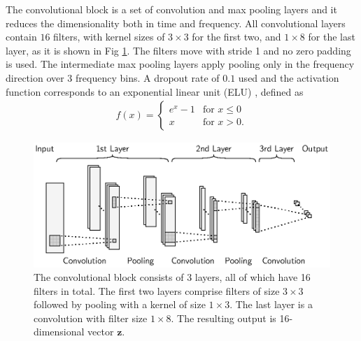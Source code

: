 \documentclass{scrartcl}
\begin{document}
The convolutional block is a set of convolution and max pooling layers and it reduces the dimensionality both in time and frequency. All convolutional layers contain $16$ filters, with kernel sizes of $3\times3$ for the first two, and $1\times8$ for the last layer, as it is shown in Fig \ref{fig:conv_block}. The filters move with stride 1 and no zero padding is used. The intermediate max pooling layers apply pooling only in the frequency direction over $3$ frequency bins. A dropout \cite{Tompson2015} rate of $0.1$ used and the activation function corresponds to an exponential linear unit (ELU) \cite{Clevert2015}, defined as
\begin{align}
{ f(x)={\begin{cases}e^{x}-1&{\text{for }}x\leq 0\\x&{\text{for }}x>0.\end{cases}}}
\end{align}
\begin{figure}[htbp]
\centering
\includegraphics[scale=1.0]{figures/conv_block.eps}
\caption{The convolutional block consists of 3 layers, all of which have 16 filters in total. The first two layers comprise filters of size $3\times3$ followed by pooling with a kernel of size $1\times3$. The last layer is a convolution with filter size $1\times8$. The resulting output is 16-dimensional vector $\mathbf z$.}
\label{fig:conv_block}
\end{figure}    
\end{document}
